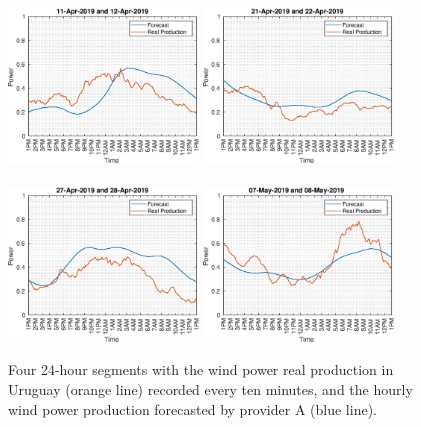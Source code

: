 \documentclass[11pt]{article}
\theoremstyle{definition}
\begin{document}
\begin{figure}[H]
\centering
\includegraphics[width=0.45\textwidth]{plots/four_days/377.eps}
\includegraphics[width=0.45\textwidth]{plots/four_days/417.eps}\\
\quad\\
\includegraphics[width=0.45\textwidth]{plots/four_days/437.eps}
\includegraphics[width=0.45\textwidth]{plots/four_days/477.eps}
\caption{Four 24-hour segments with the wind power real production in Uruguay (orange line) recorded every ten minutes, and the hourly wind power production forecasted by provider A (blue line).}
  \label{fig:sample_data}
\end{figure}
\end{document}
